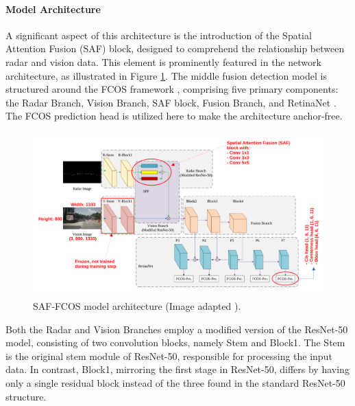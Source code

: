 \documentclass[report.tex]{subfiles}
\begin{document}

    \paragraph*{Model Architecture}

    A significant aspect of this architecture is the introduction of the Spatial Attention Fusion (SAF) block, designed to comprehend the relationship between radar and vision data. This element is prominently featured in the network architecture, as illustrated in Figure \ref{fig:saffcos_model_architecture}. The middle fusion detection model is structured around the FCOS framework \cite{tian2019fcos}, comprising five primary components: the Radar Branch, Vision Branch, SAF block, Fusion Branch, and RetinaNet \cite{tian2019fcos}. The FCOS prediction head is utilized here to make the architecture anchor-free.

    \begin{figure}[h]
        \centering
        \includegraphics[width=1.0\textwidth]{images/methods/saf_fcos/model_architecture.pdf}
        \caption{SAF-FCOS model architecture (Image adapted \cite{chang2020spatial}).}
        \label{fig:saffcos_model_architecture}
    \end{figure}                

    Both the Radar and Vision Branches employ a modified version of the ResNet-50 \cite{he2016deep} model, consisting of two convolution blocks, namely Stem and Block1. The Stem is the original stem module of ResNet-50, responsible for processing the input data. In contrast, Block1, mirroring the first stage in ResNet-50, differs by having only a single residual block instead of the three found in the standard ResNet-50 structure.
\end{document}
